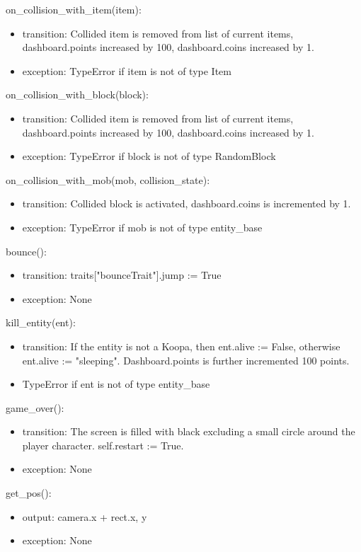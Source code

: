 \documentclass[12pt]{article}
\begin{document}
on\_collision\_with\_item(item):
\begin{itemize}
    \item transition: Collided item is removed from list of current items, dashboard.points increased by 100, dashboard.coins increased by 1.
    \item exception: TypeError if item is not of type Item
\end{itemize}

on\_collision\_with\_block(block):
\begin{itemize}
    \item transition: Collided item is removed from list of current items, dashboard.points increased by 100, dashboard.coins increased by 1.
    \item exception: TypeError if block is not of type RandomBlock
\end{itemize}

on\_collision\_with\_mob(mob, collision\_state):
\begin{itemize}
    \item transition: Collided block is activated, dashboard.coins is incremented by 1.
    \item exception: TypeError if mob is not of type entity\_base
\end{itemize}

bounce():
\begin{itemize}
    \item transition: traits["bounceTrait"].jump := True
    \item exception: None
\end{itemize}

kill\_entity(ent):
\begin{itemize}
    \item transition: If the entity is not a Koopa, then ent.alive := False, otherwise ent.alive := "sleeping". Dashboard.points is further incremented 100 points.
    \item TypeError if ent is not of type entity\_base
\end{itemize}

game\_over():
\begin{itemize}
    \item transition: The screen is filled with black excluding a small circle around the player character. self.restart := True. 
    \item exception: None
\end{itemize}

get\_pos():
\begin{itemize}
    \item output: camera.x + rect.x, y
    \item exception: None
\end{itemize}
\end{document}
